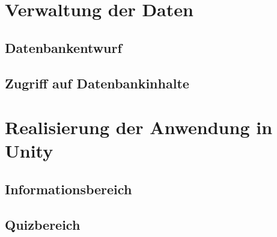 \section{Verwaltung der Daten}
\subsection{Datenbankentwurf}\label{datenbankentwurf}
\subsection{Zugriff auf Datenbankinhalte}

\section{Realisierung der Anwendung in Unity}
\subsection{Informationsbereich}
\subsection{Quizbereich}
